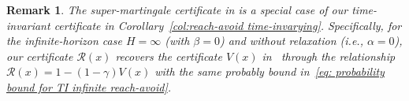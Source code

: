 \documentclass[journal,twoside,web]{ieeecolor}
\newcommand{\ml}[1]{{\color{blue}[ML: #1]}}
\newcommand{\RM}[1]{{\color{purple}[RM: #1]}}
\newcommand{\RA}{\mathcal{R}}
\theoremstyle{definition}
\theoremstyle{plain}
\newtheorem{proposition}[theorem]{Proposition}
\theoremstyle{plain}
\newtheorem{remark}{Remark}
\begin{document}


\begin{remark}
    The super-martingale certificate in \cite{vzikelic2023learning} is a special case of our time-invariant certificate in Corollary~\ref{col:reach-avoid time-invarying}. Specifically, for the infinite-horizon case $H = \infty$ (with $\beta = 0$) and without relaxation (i.e., $\alpha = 0$), our certificate $\RA(x)$ recovers the certificate $V(x)$ in~\cite{vzikelic2023learning} through the relationship
    $\RA(x) = 1 - (1-\gamma)V(x)$
    with the same probably bound in~\eqref{eq: probability bound for TI infinite reach-avoid}.
\end{remark}



\end{document}
